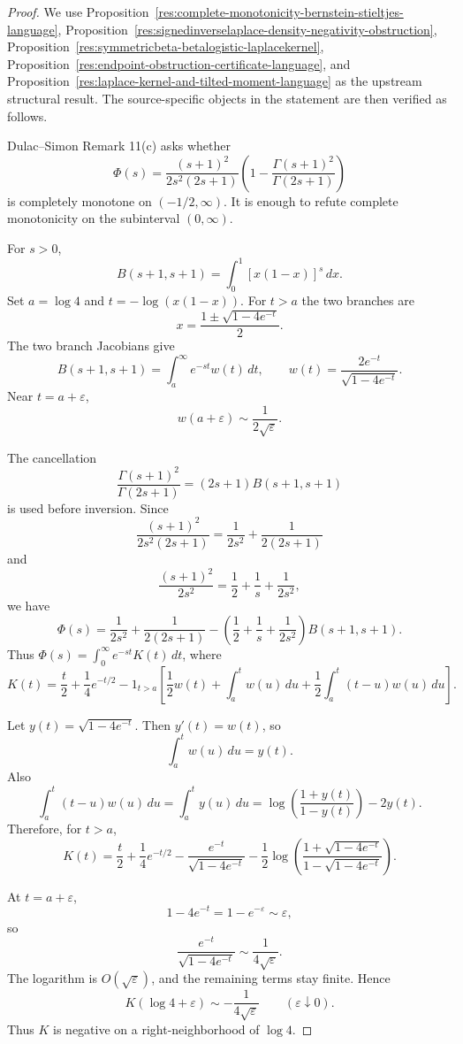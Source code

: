 \documentclass[11pt]{article}
\numberwithin{equation}{section}
\theoremstyle{definition}
\theoremstyle{remark}
\newcommand{\1}{\mathbf 1}
\begin{document}
\begin{proof}
We use Proposition~\ref{res:complete-monotonicity-bernstein-stieltjes-language}, Proposition~\ref{res:signedinverselaplace-density-negativity-obstruction}, Proposition~\ref{res:symmetricbeta-betalogistic-laplacekernel}, Proposition~\ref{res:endpoint-obstruction-certificate-language}, and Proposition~\ref{res:laplace-kernel-and-tilted-moment-language} as the upstream structural result. The source-specific objects in the statement are then verified as follows.

Dulac--Simon Remark 11(c) asks whether
\[
\Phi(s)=\frac{(s+1)^2}{2s^2(2s+1)}
\left(1-\frac{\Gamma(s+1)^2}{\Gamma(2s+1)}\right)
\]
is completely monotone on \((-1/2,\infty)\). It is enough to refute complete
monotonicity on the subinterval \((0,\infty)\).

For \(s>0\),
\[
B(s+1,s+1)=\int_0^1 [x(1-x)]^s\,dx .
\]
Set \(a=\log 4\) and \(t=-\log(x(1-x))\). For \(t>a\) the two branches are
\[
x=\frac{1\pm\sqrt{1-4e^{-t}}}{2}.
\]
The two branch Jacobians give
\[
B(s+1,s+1)
=\int_a^\infty e^{-st} w(t)\,dt,\qquad
w(t)=\frac{2e^{-t}}{\sqrt{1-4e^{-t}}}.
\]
Near \(t=a+\varepsilon\),
\[
w(a+\varepsilon)\sim \frac{1}{2\sqrt{\varepsilon}}.
\]

The cancellation
\[
\frac{\Gamma(s+1)^2}{\Gamma(2s+1)}
=(2s+1)B(s+1,s+1)
\]
is used before inversion. Since
\[
\frac{(s+1)^2}{2s^2(2s+1)}
=\frac{1}{2s^2}+\frac{1}{2(2s+1)}
\]
and
\[
\frac{(s+1)^2}{2s^2}
=\frac12+\frac1s+\frac{1}{2s^2},
\]
we have
\[
\Phi(s)=
\frac{1}{2s^2}+\frac{1}{2(2s+1)}
-\left(\frac12+\frac1s+\frac{1}{2s^2}\right)B(s+1,s+1).
\]
Thus \(\Phi(s)=\int_0^\infty e^{-st}K(t)\,dt\), where
\[
K(t)=\frac{t}{2}+\frac14e^{-t/2}
-1_{t>a}\left[
\frac12 w(t)+\int_a^t w(u)\,du
+\frac12\int_a^t(t-u)w(u)\,du
\right].
\]

Let \(y(t)=\sqrt{1-4e^{-t}}\). Then \(y'(t)=w(t)\), so
\[
\int_a^t w(u)\,du=y(t).
\]
Also
\[
\int_a^t(t-u)w(u)\,du
=\int_a^t y(u)\,du
=\log\left(\frac{1+y(t)}{1-y(t)}\right)-2y(t).
\]
Therefore, for \(t>a\),
\[
K(t)=\frac{t}{2}+\frac14e^{-t/2}
-\frac{e^{-t}}{\sqrt{1-4e^{-t}}}
-\frac12\log\left(\frac{1+\sqrt{1-4e^{-t}}}
{1-\sqrt{1-4e^{-t}}}\right).
\]

At \(t=a+\varepsilon\),
\[
1-4e^{-t}=1-e^{-\varepsilon}\sim\varepsilon,
\]
so
\[
\frac{e^{-t}}{\sqrt{1-4e^{-t}}}
\sim\frac{1}{4\sqrt{\varepsilon}}.
\]
The logarithm is \(O(\sqrt{\varepsilon})\), and the remaining terms stay finite.
Hence
\[
K(\log4+\varepsilon)
\sim -\frac{1}{4\sqrt{\varepsilon}}
\qquad(\varepsilon\downarrow0).
\]
Thus \(K\) is negative on a right-neighborhood of \(\log4\).
\end{proof}
\end{document}
